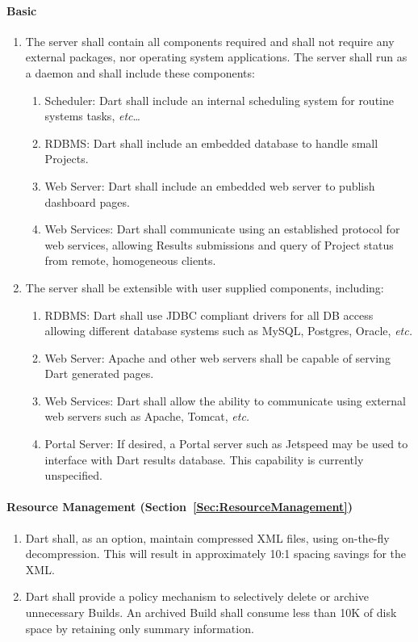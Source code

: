\documentclass{InsightBook}
\begin{document}
\paragraph{Basic}
\begin{enumerate}
\item The server shall contain all components required and shall not
require any external packages, nor operating system applications.
The server shall run as a daemon and shall include these components:
        \begin{enumerate}
        \item Scheduler: Dart shall include an internal scheduling
system for routine systems tasks, \emph{etc}\ldots
        \item RDBMS: Dart shall include an embedded database to
handle small Projects.
        \item Web Server: Dart shall include an embedded web server
to publish dashboard pages.
        \item Web Services: Dart shall communicate using an
established protocol for web services, allowing Results submissions
and query of Project status from remote, homogeneous clients.
        \end{enumerate}
\item The server shall be extensible with user supplied components,
including:
        \begin{enumerate}
        \item RDBMS: Dart shall use JDBC compliant drivers for all DB
access allowing different database systems such as MySQL, Postgres,
Oracle, \emph{etc.}
        \item Web Server: Apache and other web servers shall be
capable of serving Dart generated pages.
        \item Web Services: Dart shall allow the ability to
communicate using external web servers such as Apache, Tomcat,
\emph{etc.}
        \item Portal Server: If desired, a Portal server such as
Jetspeed may be used to interface with Dart results database.  This
capability is currently unspecified.
        \end{enumerate}
\end{enumerate}
\paragraph{Resource Management (Section~\ref{Sec:ResourceManagement})}
\begin{enumerate}
\item Dart shall, as an option, maintain compressed XML files, using
on-the-fly decompression.  This will result in approximately 10:1
spacing savings for the XML. 
\item Dart shall provide a policy mechanism to selectively delete
or archive unnecessary Builds.  An archived Build shall consume less
than 10K of disk space by retaining only summary information.
\end{enumerate}
\end{document}
